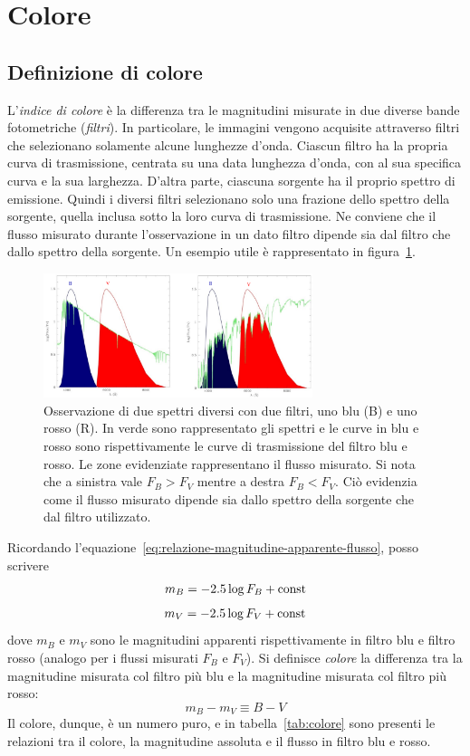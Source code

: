 \section{Colore}\label{sec:colore}
\subsection{Definizione di colore}
L'\emph{indice di colore} è la differenza tra le magnitudini misurate in due diverse bande fotometriche (\emph{filtri}). In particolare, le immagini vengono acquisite attraverso filtri che selezionano solamente alcune lunghezze d'onda. Ciascun filtro ha la propria curva di trasmissione, centrata su una data lunghezza d'onda, con al sua specifica curva e la sua larghezza. D'altra parte, ciascuna sorgente ha il proprio spettro di emissione. Quindi i diversi filtri selezionano solo una frazione dello spettro della sorgente, quella inclusa sotto la loro curva di trasmissione. Ne conviene che il flusso misurato durante l'osservazione in un dato filtro dipende sia dal filtro che dallo spettro della sorgente. Un esempio utile è rappresentato in figura~\ref{fig:filtri-fotometrici}.

\begin{figure}
\centering
\includegraphics[width=0.7\textwidth]{immagini/filtri-fotometrici.png}
\caption{Osservazione di due spettri diversi con due filtri, uno blu (B) e uno rosso (R). In verde sono rappresentato gli spettri e le curve in blu e rosso sono rispettivamente le curve di trasmissione del filtro blu e rosso. Le zone evidenziate rappresentano il flusso misurato. Si nota che a sinistra vale $F_B > F_V$ mentre a destra $F_B < F_V$. Ciò evidenzia come il flusso misurato dipende sia dallo spettro della sorgente che dal filtro utilizzato.}
\label{fig:filtri-fotometrici}
\end{figure}

Ricordando l'equazione~\eqref{eq:relazione-magnitudine-apparente-flusso}, posso scrivere
\[
    m_B = -2.5 \log F_B + \textup{const}
\]
\[
    m_V = -2.5 \log F_V + \textup{const}
\]
dove $m_B$ e $m_V$ sono le magnitudini apparenti rispettivamente in filtro blu e filtro rosso (analogo per i flussi misurati $F_B$ e $F_V$). Si definisce \emph{colore} la differenza tra la magnitudine misurata col filtro più blu e la magnitudine misurata col filtro più rosso:
\begin{equation}\label{eq:colore}
    m_B - m_V \equiv B-V
\end{equation}
Il colore, dunque, è un numero puro, e in tabella~\ref{tab:colore} sono presenti le relazioni tra il colore, la magnitudine assoluta e il flusso in filtro blu e rosso. 


